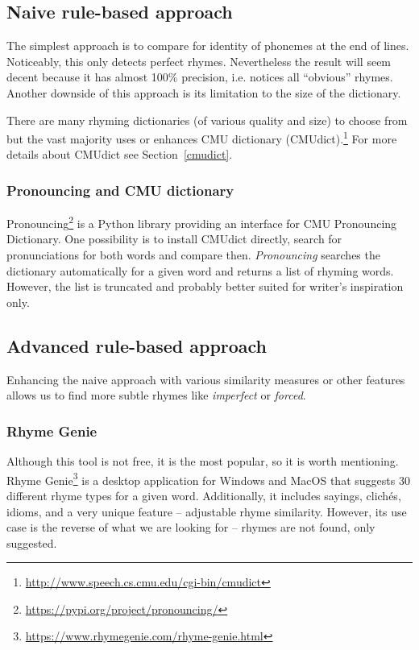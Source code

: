 \subsection{Naive rule-based approach} 
The simplest approach is to compare for identity of phonemes at the end of lines. Noticeably,  this only detects perfect rhymes. Nevertheless the result will seem decent because it has almost 100\% precision, i.e. notices all ``obvious'' rhymes. Another downside of this approach is its limitation to the size of the dictionary.

There are many rhyming dictionaries (of various quality and size) to choose from but the vast majority uses or enhances CMU dictionary (CMUdict).\footnote{\url{http://www.speech.cs.cmu.edu/cgi-bin/cmudict}} For more details about CMUdict see Section~\ref{cmudict}.
\subsubsection*{Pronouncing and CMU dictionary}
Pronouncing\footnote{\url{https://pypi.org/project/pronouncing/}} is a Python library providing an interface for CMU Pronouncing Dictionary. One possibility is to install CMUdict directly, search for pronunciations for both words and compare then. \textit{Pronouncing} searches the dictionary automatically for a given word and returns a list of rhyming words. However, the list is truncated and probably better suited for writer's inspiration only.


\subsection{Advanced rule-based approach}
Enhancing the naive approach with various similarity measures or other features allows us to find more subtle rhymes like \textit{imperfect} or \textit{forced}.

\subsubsection*{Rhyme Genie}
Although this tool is not free, it is the most popular, so it is worth mentioning. Rhyme Genie\footnote{\url{https://www.rhymegenie.com/rhyme-genie.html}} is a desktop application for Windows and MacOS that suggests 30 different rhyme types for a given word. Additionally, it includes sayings, clichés, idioms, and a very unique feature -- adjustable rhyme similarity. However, its use case is the reverse of what we are looking for -- rhymes are not found, only suggested.

